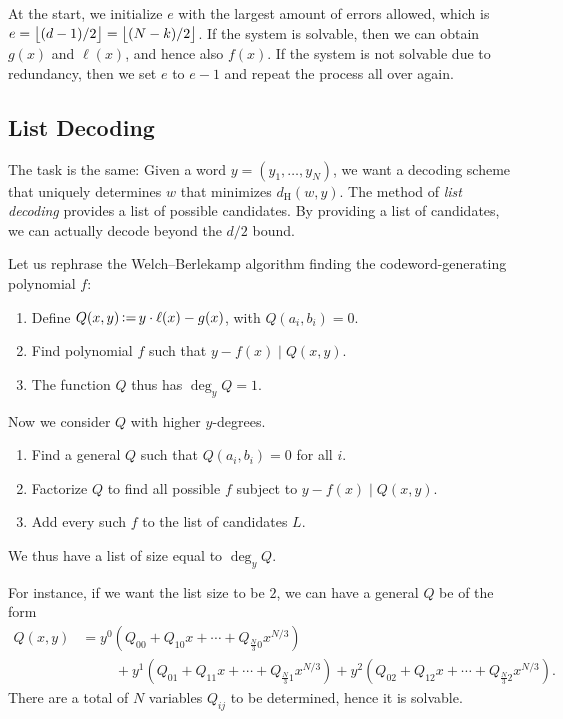 At the start, we initialize $e$ with the largest amount of errors allowed, which is $e=\left\lfloor{(d-1)/2}\right\rfloor = \left\lfloor{(N-k)/2}\right\rfloor$. If the system is solvable, then we can obtain $g(x)$ and $\ell(x)$, and hence also $f(x)$. If the system is not solvable due to redundancy, then we set $e$ to $e-1$ and repeat the process all over again.

\subsection{List Decoding}
The task is the same: Given a word $y=(y_1,\ldots,y_N)$, we want a decoding scheme that uniquely determines $w$ that minimizes $d_\mathrm{H}(w,y)$. The method of \textit{list decoding} provides a list of possible candidates. By providing a list of candidates, we can actually decode beyond the $d/2$ bound.

Let us rephrase the Welch--Berlekamp algorithm finding the codeword-generating polynomial $f$:
\begin{enumerate}
    \item Define $Q(x,y) \operatorname{\vcentcolon=} y\cdot \ell(x)-g(x)$, with $Q(a_i,b_i)=0$.
    \item Find polynomial $f$ such that $y-f(x)\mid Q(x,y)$.
    \item The function $Q$ thus has $\deg_y Q=1$.
\end{enumerate}
Now we consider $Q$ with higher $y$-degrees.
\begin{enumerate}
    \item Find a general $Q$ such that $Q(a_i,b_i)=0$ for all $i$.
    \item Factorize $Q$ to find all possible $f$ subject to $y-f(x)\mid Q(x,y)$.
    \item Add every such $f$ to the list of candidates $L$.
\end{enumerate}
We thus have a list of size equal to $\deg_yQ$.

\begin{example}
    For instance, if we want the list size to be $2$, we can have a general $Q$ be of the form
    \begin{align*}
        Q(x,y) &= y^0\left(Q_{00}+Q_{10}x+\cdots+Q_{\frac{N}{3}0}x^{N/3}\right) \\
        & \hspace{1cm} + y^1\left(Q_{01}+Q_{11}x+\cdots+Q_{\frac{N}{3}1}x^{N/3}\right) + y^2\left(Q_{02}+Q_{12}x+\cdots+Q_{\frac{N}{3}2}x^{N/3}\right). 
    \end{align*}
    There are a total of $N$ variables $Q_{ij}$ to be determined, hence it is solvable.
\end{example}

